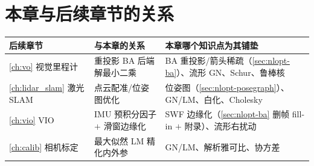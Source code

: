 \section*{本章与后续章节的关系}
\begin{table}[H]\centering\small
\begin{tabular}{lll}
\toprule
后续章节 & 与本章的关系 & 本章哪个知识点为其铺垫 \\
\midrule
\cref{ch:vo} 视觉里程计 & 重投影 BA 后端解最小二乘 & BA 重投影/箭头稀疏（\cref{sec:nlopt-ba}）、流形 GN、Schur、鲁棒核 \\
\cref{ch:lidar_slam} 激光 SLAM & 点云配准/位姿图优化 & 位姿图（\cref{sec:nlopt-posegraph}）、GN/LM、白化、Cholesky \\
\cref{ch:vio} VIO & IMU 预积分因子 $+$ 滑窗边缘化 & SWF 边缘化（\cref{sec:nlopt-ba} 删帧 fill-in $+$ 附录）、流形右扰动 \\
\cref{ch:calib} 相机标定 & 最大似然 LM 精化内外参 & GN/LM、解析雅可比、协方差 \\
\bottomrule
\end{tabular}
\end{table}

